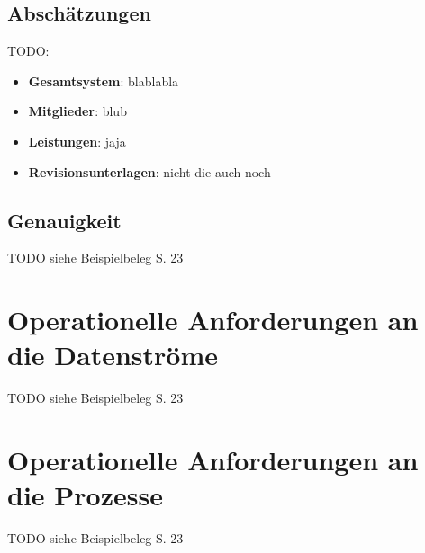 \subsection{Abschätzungen}
TODO:
\begin{itemize}
 \item \textbf{Gesamtsystem}: blablabla
 \item \textbf{Mitglieder}: blub
 \item \textbf{Leistungen}: jaja
 \item \textbf{Revisionsunterlagen}: nicht die auch noch
\end{itemize}

\subsection{Genauigkeit}
TODO siehe Beispielbeleg S. 23

\section{Operationelle Anforderungen an die Datenströme}
TODO siehe Beispielbeleg S. 23

\section{Operationelle Anforderungen an die Prozesse}
TODO siehe Beispielbeleg S. 23